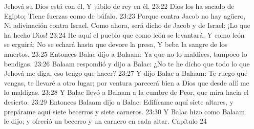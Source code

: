 Jehová su Dios está con él,  
Y júbilo de rey en él.  
23:22 Dios los ha sacado de Egipto;  
Tiene fuerzas como de búfalo.  
23:23 Porque contra Jacob no hay agüero,  
Ni adivinación contra Israel.  
Como ahora, será dicho de Jacob y de Israel:  
¡Lo que ha hecho Dios!  
23:24 He aquí el pueblo que como león se levantará,  
Y como león se erguirá;  
No se echará hasta que devore la presa,  
Y beba la sangre de los muertos.  
23:25 Entonces Balac dijo a Balaam: Ya que no lo maldices, tampoco lo bendigas.  
23:26 Balaam respondió y dijo a Balac: ¿No te he dicho que todo lo que Jehová me diga, eso tengo que hacer?  
23:27 Y dijo Balac a Balaam: Te ruego que vengas, te llevaré a otro lugar; por ventura parecerá bien a Dios que desde allí me lo maldigas.  
23:28 Y Balac llevó a Balaam a la cumbre de Peor, que mira hacia el desierto.  
23:29 Entonces Balaam dijo a Balac: Edifícame aquí siete altares, y prepárame aquí siete becerros y siete carneros.  
23:30 Y Balac hizo como Balaam le dijo; y ofreció un becerro y un carnero en cada altar.  
Capítulo 24 

